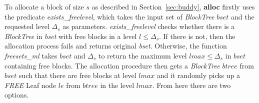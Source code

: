 %
%





To allocate a block of size $s$ as described in Section~\ref{sec:buddy}, \textbf{alloc} firstly uses the predicate \emph{exists\_freelevel}, which takes the input set of \emph{BlockTree} $bset$  and the requested level  $\Delta_s$  as parameters. \emph{exists\_freelevel} checks whether there is a \emph{BlockTree} in \emph{bset} with free blocks in a level $l \leq \Delta_s$. If there is not, then the allocation process fails and returns original \emph{bset}. Otherwise, the function \emph{freesets\_ml} takes $bset$ and $\Delta_s$ to return the maximum level $lmax \leq \Delta_s$ in $bset$ containing free blocks. The allocation procedure then gets a \emph{BlockTree} $btree$ from $bset$ such that there are free blocks at level $lmax$ and it randomly picks up a \emph{FREE} Leaf node $le$ from $btree$ in the level $lmax$. From here there are two options. 

